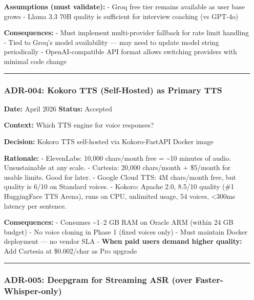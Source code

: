 \documentclass[
  11pt,
]{article}
\begin{document}
\textbf{Assumptions (must validate):} - Groq free tier remains available
as user base grows - Llama 3.3 70B quality is sufficient for interview
coaching (vs GPT-4o)

\textbf{Consequences:} - Must implement multi-provider fallback for rate
limit handling - Tied to Groq's model availability --- may need to
update model string periodically - OpenAI-compatible API format allows
switching providers with minimal code change

\begin{center}\rule{0.5\linewidth}{0.5pt}\end{center}

\hypertarget{adr-004-kokoro-tts-self-hosted-as-primary-tts}{%
\subsubsection{ADR-004: Kokoro TTS (Self-Hosted) as Primary
TTS}\label{adr-004-kokoro-tts-self-hosted-as-primary-tts}}

\textbf{Date:} April 2026 \textbar{} \textbf{Status:} Accepted

\textbf{Context:} Which TTS engine for voice responses?

\textbf{Decision:} Kokoro TTS self-hosted via Kokoro-FastAPI Docker
image

\textbf{Rationale:} - ElevenLabs: 10,000 chars/month free =
\textasciitilde10 minutes of audio. Unsustainable at any scale. -
Cartesia: 20,000 chars/month + \$5/month for usable limits. Good for
later. - Google Cloud TTS: 4M chars/month free, but quality is 6/10 on
Standard voices. - Kokoro: Apache 2.0, 8.5/10 quality (\#1 HuggingFace
TTS Arena), runs on CPU, unlimited usage, 54 voices, \textless300ms
latency per sentence.

\textbf{Consequences:} - Consumes \textasciitilde1--2 GB RAM on Oracle
ARM (within 24 GB budget) - No voice cloning in Phase 1 (fixed voices
only) - Must maintain Docker deployment --- no vendor SLA - \textbf{When
paid users demand higher quality:} Add Cartesia at \$0.002/char as Pro
upgrade

\begin{center}\rule{0.5\linewidth}{0.5pt}\end{center}

\hypertarget{adr-005-deepgram-for-streaming-asr-over-faster-whisper-only}{%
\subsubsection{ADR-005: Deepgram for Streaming ASR (over
Faster-Whisper-only)}\label{adr-005-deepgram-for-streaming-asr-over-faster-whisper-only}}
\end{document}
